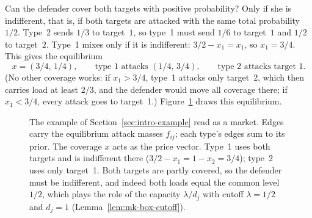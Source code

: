 Can the defender cover both targets with positive probability? Only if she is indifferent, that is, if
both targets are attacked with the same total probability $1/2$. Type~2 sends $1/3$ to target~$1$, so
type~1 must send $1/6$ to target~$1$ and $1/2$ to target~$2$. Type~1 mixes only if it is indifferent:
$3/2-x_1=x_1$, so $x_1=3/4$. This gives the equilibrium
\[
x=(3/4,\,1/4),\qquad \text{type 1 attacks }(1/4,\,3/4),\qquad \text{type 2 attacks target }1.
\]
(No other coverage works: if $x_1>3/4$, type~1 attacks only target~2, which then carries load at least $2/3$, and
the defender would move all coverage there; if $x_1<3/4$, every attack goes to target~1.)
Figure~\ref{fig:example-market} draws this equilibrium.

\begin{figure}[t]
\centering
{}
\caption{The example of Section~\ref{sec:intro-example} read as a market. Edges carry the equilibrium
attack masses $f_{ij}$; each type's edges sum to its prior. The coverage $x$ acts as the price vector.
Type~1 uses both targets and is indifferent there ($3/2-x_1=1-x_2=3/4$); type~2 uses only
target~1. Both targets are partly covered, so the defender must be indifferent, and indeed both loads
equal the common level $1/2$, which plays the role of the capacity $\lambda/d_j$ with cutoff
$\lambda=1/2$ and $d_j=1$ (Lemma~\ref{lem:mk-box-cutoff}).}
\label{fig:example-market}
\end{figure}

